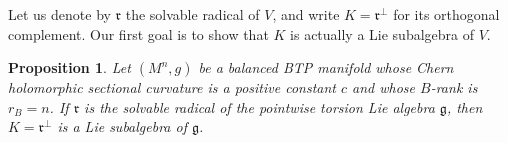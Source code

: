 \documentclass{amsart}
\newtheorem{proposition}{Proposition}
\newcommand{\revnote}[1]{\par\Needspace{10\baselineskip}\smallskip\noindent
  {\color{orange}\textbf{Revision note.} #1}\par\nopagebreak[4]\smallskip}
\begin{document}
Let us denote by ${\mathfrak r}$ the solvable radical of $V$, and write $K={\mathfrak r}^{\perp}$ for its orthogonal complement. Our first goal is to show that $K$ is actually a Lie subalgebra of $V$.

\begin{proposition} \label{prop4}
Let $(M^n,g)$ be a balanced BTP manifold whose Chern
holomorphic sectional curvature is a positive constant $c$ and whose
$B$-rank is $r_B=n$.  If $\mathfrak r$ is the solvable radical of the
pointwise torsion Lie algebra $\mathfrak g$, then
$K=\mathfrak r^\perp$ is a Lie subalgebra of $\mathfrak g$.
\end{proposition}
\end{document}
